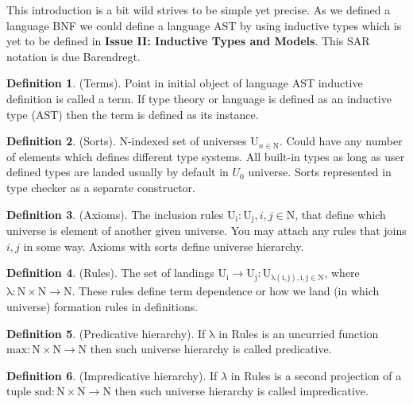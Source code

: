 \documentclass{article}
\theoremstyle{definition}
\newtheorem{definition}{Definition}
\begin{document}
This introduction is a bit wild strives to be simple yet precise.
As we defined a language BNF we could define a language AST by
using inductive types which is yet to be defined
in {\bf Issue II: Inductive Types and Models}. This SAR notation is due Barendregt.

\begin{definition} (Terms). Point in initial object of language AST
inductive definition is called a term. If type theory or language is defined as
an inductive type (AST) then the term is defined as its instance.
\end{definition}

\begin{definition} (Sorts). N-indexed set of universes $\mathrm{U}_{n \in \mathrm{N}}$.
Could have any number of elements which defines different type systems. All built-in
types as long as user defined types are landed usually by default in $U_0$ universe.
Sorts represented in type checker as a separate constructor.
\end{definition}

\begin{definition} (Axioms). The inclusion rules {\bf $\mathrm{U_i : U_j}, i,j \in \mathrm{N}$},
that define which universe is element of another given universe. You may attach
any rules that joins $i,j$ in some way. Axioms with sorts define universe hierarchy.
\end{definition}

\begin{definition} (Rules). The set of landings
$\mathrm{U_i} \rightarrow \mathrm{U_j} : \mathrm{U_{\lambda(i,j), i,j \in \mathrm{N}}}$,
where $\mathrm{\lambda : N \times N \rightarrow N}$. These rules define term dependence or
how we land (in which universe) formation rules in definitions.
\end{definition}

\begin{definition} (Predicative hierarchy). If $\mathrm{\lambda}$ in Rules
is an uncurried function $\mathrm{max : N \times N \rightarrow N}$
then such universe hierarchy is called predicative.
\end{definition}

\begin{definition} (Impredicative hierarchy). If $\lambda$ in Rules
is a second projection of a tuple $\mathrm{snd : N \times N \rightarrow N}$
then such universe hierarchy is called impredicative.
\end{definition}
\end{document}
